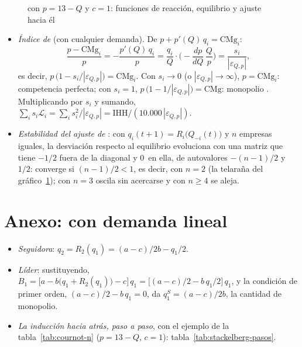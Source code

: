 \documentclass[11pt]{article}
\begin{document}
\begin{figure}[H]
\centering
\caption{ con $p=13-Q$ y $c=1$: funciones de reacción, equilibrio y ajuste hacia él}\label{fig:cournot-lineal}
\end{figure}

\begin{itemize}
\item \emph{Índice de } (con cualquier demanda). De $p+p'(Q)\,q_i=\mathrm{CMg}_i$:
  \[
  \frac{p-\mathrm{CMg}_i}{p}=-\frac{p'(Q)\,q_i}{p}=\frac{q_i}{Q}\cdot\Big(-\frac{dp}{dQ}\,\frac{Q}{p}\Big)=\frac{s_i}{|\varepsilon_{Q,p}|},
  \]
  es decir, $p\,\big(1-s_i/|\varepsilon_{Q,p}|\big)=\mathrm{CMg}_i$. Con $s_i\to0$ (o $|\varepsilon_{Q,p}|\to\infty$), $p=\mathrm{CMg}_i$: competencia perfecta; con $s_i=1$, $p\,\big(1-1/|\varepsilon_{Q,p}|\big)=\mathrm{CMg}$: monopolio . Multiplicando por $s_i$ y sumando, $\sum_is_i\mathcal{L}_i=\sum_is_i^2/|\varepsilon_{Q,p}|=\mathrm{IHH}/(10.000\,|\varepsilon_{Q,p}|)$.\findemo
\item \emph{Estabilidad del ajuste de }: con $q_i(t+1)=R_i\big(Q_{-i}(t)\big)$ y $n$ empresas iguales, la desviación respecto al equilibrio evoluciona con una matriz que tiene $-1/2$ fuera de la diagonal y 0~en ella, de autovalores $-(n-1)/2$ y $1/2$: converge si $(n-1)/2<1$, es decir, con $n=2$ (la telaraña del gráfico~\ref{fig:cournot-lineal}); con $n=3$ oscila sin acercarse y con $n\geq4$ se aleja\nocite{Theocharis1960Stability}.
\end{itemize}

\section{Anexo:  con demanda lineal}\label{anexo:stackelberg-lineal}

\begin{itemize}
\item \emph{Seguidora}: $q_2=R_2(q_1)=(a-c)/2b-q_1/2$.
\item \emph{Líder}: sustituyendo, $B_1=\big[a-b\big(q_1+R_2(q_1)\big)-c\big]\,q_1=\big[(a-c)/2-b\,q_1/2\big]\,q_1$, y la condición de primer orden, $(a-c)/2-b\,q_1=0$, da $q_1^S=(a-c)/2b$, la cantidad de monopolio.
\item \emph{La inducción hacia atrás, paso a paso}, con el ejemplo de la tabla~\ref{tab:cournot-n} ($p=13-Q$, $c=1$): tabla~\ref{tab:stackelberg-pasos}.
\end{itemize}
\end{document}
